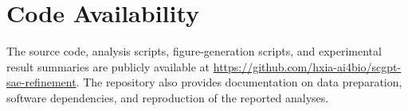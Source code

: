 \documentclass{article}
\begin{document}
\section*{Code Availability}

The source code, analysis scripts, figure-generation scripts, and experimental result summaries are publicly available at \url{https://github.com/hxia-ai4bio/scgpt-sae-refinement}. The repository also provides documentation on data preparation, software dependencies, and reproduction of the reported analyses.



\end{document}
